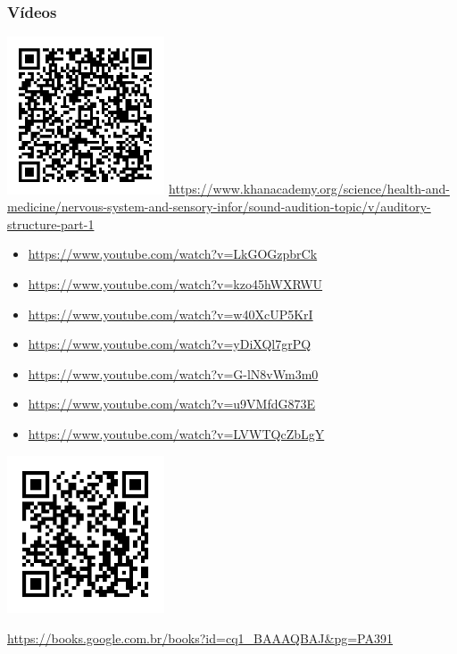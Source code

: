 \begin{frame}[allowframebreaks]
  \frametitle{Vídeos}
  
  \includegraphics[width=0.35\textwidth]{images/qrcode-khanacademy-hearing.pdf}
  \url{https://www.khanacademy.org/science/health-and-medicine/nervous-system-and-sensory-infor/sound-audition-topic/v/auditory-structure-part-1}

  \framebreak 
  \begin{itemize}
  \item \url{https://www.youtube.com/watch?v=LkGOGzpbrCk}
  \item \url{https://www.youtube.com/watch?v=kzo45hWXRWU}
  \item \url{https://www.youtube.com/watch?v=w40XcUP5KrI}
  \item \url{https://www.youtube.com/watch?v=yDiXQl7grPQ}
  \item \url{https://www.youtube.com/watch?v=G-lN8vWm3m0}
  \item \url{https://www.youtube.com/watch?v=u9VMfdG873E}
  \item \url{https://www.youtube.com/watch?v=LVWTQcZbLgY}
  \end{itemize}

  \framebreak

  \vspace{-3ex}
  \includegraphics[width=0.35\textwidth]{images/qrcode-kandel.pdf}

  \vspace{-2ex}
  
  \url{https://books.google.com.br/books?id=cq1_BAAAQBAJ&pg=PA391}
\end{frame}
